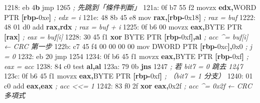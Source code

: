\documentclass[10pt,a4paper]{article}
\newenvironment{Shaded}{\begin{snugshade}}{\end{snugshade}}
\newcommand{\BaseNTok}[1]{\textcolor[rgb]{0.00,0.00,0.81}{#1}}
\newcommand{\CommentTok}[1]{\textcolor[rgb]{0.56,0.35,0.01}{\textit{#1}}}
\newcommand{\ControlFlowTok}[1]{\textcolor[rgb]{0.13,0.29,0.53}{\textbf{#1}}}
\newcommand{\DataTypeTok}[1]{\textcolor[rgb]{0.13,0.29,0.53}{#1}}
\newcommand{\DecValTok}[1]{\textcolor[rgb]{0.00,0.00,0.81}{#1}}
\newcommand{\ErrorTok}[1]{\textcolor[rgb]{0.64,0.00,0.00}{\textbf{#1}}}
\newcommand{\FloatTok}[1]{\textcolor[rgb]{0.00,0.00,0.81}{#1}}
\newcommand{\KeywordTok}[1]{\textcolor[rgb]{0.13,0.29,0.53}{\textbf{#1}}}
\newcommand{\NormalTok}[1]{#1}
\newcommand{\OperatorTok}[1]{\textcolor[rgb]{0.81,0.36,0.00}{\textbf{#1}}}
\renewenvironment{Shaded}{%
  \def\FrameCommand{\fboxsep=3.2pt\colorbox{shadecolor}}%
  \MakeFramed{\advance\hsize-\width\FrameRestore\small}%
}{%
  \endMakeFramed
}
\begin{document}
\begin{Shaded}
\begin{Highlighting}[]
\NormalTok{1218: eb }\DecValTok{4}\ErrorTok{b}\NormalTok{                  jmp    }\DecValTok{1265}                  \CommentTok{; 先跳到「條件判斷」}
\NormalTok{121a: 0f b7 }\DecValTok{55}\NormalTok{ f2            movzx  }\KeywordTok{edx}\OperatorTok{,}\DataTypeTok{WORD} \DataTypeTok{PTR} \OperatorTok{[}\KeywordTok{rbp}\OperatorTok{{-}}\BaseNTok{0xe}\OperatorTok{]} \CommentTok{; edx = i}
\NormalTok{121e: 48 8b 45 e8            mov    }\KeywordTok{rax}\OperatorTok{,[}\KeywordTok{rbp}\OperatorTok{{-}}\BaseNTok{0x18}\OperatorTok{]}        \CommentTok{; rax = buf}
\NormalTok{1222: 48 01 d0               add    }\KeywordTok{rax}\OperatorTok{,}\KeywordTok{rdx}               \CommentTok{; rax = buf + i}
\NormalTok{1225: 0f b6 }\DecValTok{00}\NormalTok{               movzx  }\KeywordTok{eax}\OperatorTok{,}\DataTypeTok{BYTE} \DataTypeTok{PTR} \OperatorTok{[}\KeywordTok{rax}\OperatorTok{]}    \CommentTok{; eax = buf[i]}
\NormalTok{1228: 30 45 f1               }\OperatorTok{xor}    \DataTypeTok{BYTE} \DataTypeTok{PTR} \OperatorTok{[}\KeywordTok{rbp}\OperatorTok{{-}}\BaseNTok{0xf}\OperatorTok{],}\KeywordTok{al} \CommentTok{; acc \^{}= buf[i]  ← CRC 第一步}
\NormalTok{122b: c7 }\DecValTok{45}\NormalTok{ f4 }\DecValTok{00} \DecValTok{00} \DecValTok{00} \DecValTok{00}\NormalTok{   mov    }\DataTypeTok{DWORD} \DataTypeTok{PTR} \OperatorTok{[}\KeywordTok{rbp}\OperatorTok{{-}}\BaseNTok{0xc}\OperatorTok{],}\BaseNTok{0x0} \CommentTok{; j = 0}
\NormalTok{1232: eb }\DecValTok{20}\NormalTok{                  jmp    }\DecValTok{1254}
\NormalTok{1234: 0f b6 }\DecValTok{45}\NormalTok{ f1            movzx  }\KeywordTok{eax}\OperatorTok{,}\DataTypeTok{BYTE} \DataTypeTok{PTR} \OperatorTok{[}\KeywordTok{rbp}\OperatorTok{{-}}\BaseNTok{0xf}\OperatorTok{]} \CommentTok{; eax = acc}
\NormalTok{1238: 84 c0                  test   }\KeywordTok{al}\OperatorTok{,}\KeywordTok{al}
\NormalTok{123a: 79 0b                  }\ControlFlowTok{jns}    \DecValTok{1247}                  \CommentTok{; 若 bit7 = 0 跳去 1247}
\NormalTok{123c: 0f b6 }\DecValTok{45}\NormalTok{ f1            movzx  }\KeywordTok{eax}\OperatorTok{,}\DataTypeTok{BYTE} \DataTypeTok{PTR} \OperatorTok{[}\KeywordTok{rbp}\OperatorTok{{-}}\BaseNTok{0xf}\OperatorTok{]} \CommentTok{; （bit7 = 1 分支）}
\NormalTok{1240: 01 c0                  add    }\KeywordTok{eax}\OperatorTok{,}\KeywordTok{eax}               \CommentTok{; acc \textless{}\textless{}= 1}
\NormalTok{1242: 83 f0 }\FloatTok{2}\BaseNTok{f}               \OperatorTok{xor}    \KeywordTok{eax}\OperatorTok{,}\BaseNTok{0x2f}              \CommentTok{; acc \^{}= 0x2f   ← CRC 多項式}

\end{Highlighting}
\end{Shaded}
\end{document}
